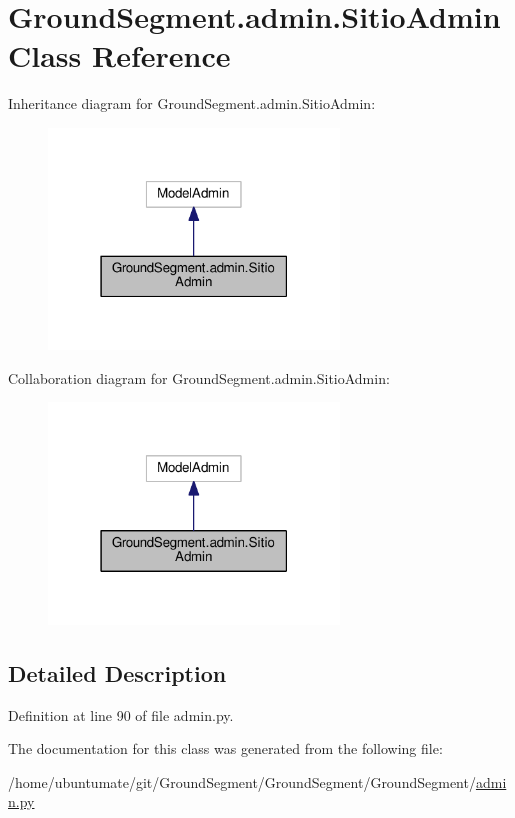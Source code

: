 \hypertarget{class_ground_segment_1_1admin_1_1_sitio_admin}{}\section{Ground\+Segment.\+admin.\+Sitio\+Admin Class Reference}
\label{class_ground_segment_1_1admin_1_1_sitio_admin}


Inheritance diagram for Ground\+Segment.\+admin.\+Sitio\+Admin\+:\nopagebreak
\begin{figure}[H]
\begin{center}
\leavevmode
\includegraphics[width=219pt]{class_ground_segment_1_1admin_1_1_sitio_admin__inherit__graph}
\end{center}
\end{figure}


Collaboration diagram for Ground\+Segment.\+admin.\+Sitio\+Admin\+:\nopagebreak
\begin{figure}[H]
\begin{center}
\leavevmode
\includegraphics[width=219pt]{class_ground_segment_1_1admin_1_1_sitio_admin__coll__graph}
\end{center}
\end{figure}


\subsection{Detailed Description}


Definition at line 90 of file admin.\+py.



The documentation for this class was generated from the following file\+:\begin{DoxyCompactItemize}
\item 
/home/ubuntumate/git/\+Ground\+Segment/\+Ground\+Segment/\+Ground\+Segment/\hyperlink{admin_8py}{admin.\+py}\end{DoxyCompactItemize}
